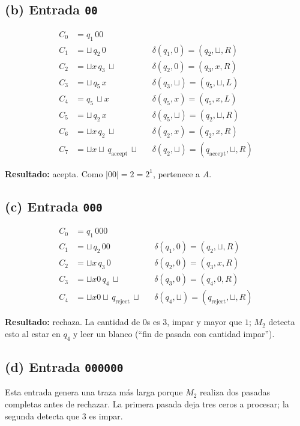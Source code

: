\documentclass[11pt,a4paper]{article}
\theoremstyle{plain}
\theoremstyle{definition}
\theoremstyle{remark}
\newcommand{\qaccept}{q_{\text{accept}}}
\newcommand{\qreject}{q_{\text{reject}}}
\newcommand{\blank}{\sqcup}
\begin{document}
\subsection*{(b) Entrada \texttt{00}}

\begin{align*}
C_0 &= q_1\,00 \\
C_1 &= \blank\,q_2\,0           &&\delta(q_1,0)=(q_2,\blank,R)\\
C_2 &= \blank x\,q_3\,\blank    &&\delta(q_2,0)=(q_3,x,R)\\
C_3 &= \blank\,q_5\,x           &&\delta(q_3,\blank)=(q_5,\blank,L)\\
C_4 &= q_5\,\blank x            &&\delta(q_5,x)=(q_5,x,L)\\
C_5 &= \blank\,q_2\,x           &&\delta(q_5,\blank)=(q_2,\blank,R)\\
C_6 &= \blank x\,q_2\,\blank    &&\delta(q_2,x)=(q_2,x,R)\\
C_7 &= \blank x\blank\,\qaccept\,\blank &&\delta(q_2,\blank)=(\qaccept,\blank,R)
\end{align*}

\textbf{Resultado:} acepta. Como $|00|=2=2^1$, pertenece a $A$.

\subsection*{(c) Entrada \texttt{000}}

\begin{align*}
C_0 &= q_1\,000 \\
C_1 &= \blank\,q_2\,00          &&\delta(q_1,0)=(q_2,\blank,R)\\
C_2 &= \blank x\,q_3\,0         &&\delta(q_2,0)=(q_3,x,R)\\
C_3 &= \blank x0\,q_4\,\blank   &&\delta(q_3,0)=(q_4,0,R)\\
C_4 &= \blank x0\blank\,\qreject\,\blank &&\delta(q_4,\blank)=(\qreject,\blank,R)
\end{align*}

\textbf{Resultado:} rechaza. La cantidad de $0$s es $3$, impar y mayor que
$1$; $M_2$ detecta esto al estar en $q_4$ y leer un blanco (``fin de pasada
con cantidad impar'').

\subsection*{(d) Entrada \texttt{000000}}

Esta entrada genera una traza m\'as larga porque $M_2$ realiza dos pasadas
completas antes de rechazar. La primera pasada deja tres ceros a procesar;
la segunda detecta que $3$ es impar.
\end{document}
